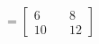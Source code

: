 \documentclass[preview]{standalone}
\begin{document}
\begin{align*}
=\begin{bmatrix} 6 & \quad 8 \\ 10 & \quad 12 \end{bmatrix}
\end{align*}
\end{document}
